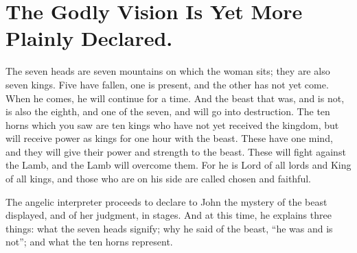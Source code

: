\chapter[Sermon 75. The Godly Vision Is Yet More Plainly Declared.]{The Godly Vision Is Yet More Plainly Declared.}
\label{sermon:075}

The seven heads are seven mountains on which the woman sits; they are also seven kings. Five have fallen, one is present, and the other has not yet come. When he comes, he will continue for a time. And the beast that was, and is not, is also the eighth, and one of the seven, and will go into destruction. The ten horns which you saw are ten kings who have not yet received the kingdom, but will receive power as kings for one hour with the beast. These have one mind, and they will give their power and strength to the beast. These will fight against the Lamb, and the Lamb will overcome them. For he is Lord of all lords and King of all kings, and those who are on his side are called chosen and faithful.

The angelic interpreter proceeds to declare to John the mystery of the beast displayed, and of her judgment, in stages. And at this time, he explains three things: what the seven heads signify; why he said of the beast, “he was and is not”; and what the ten horns represent.

